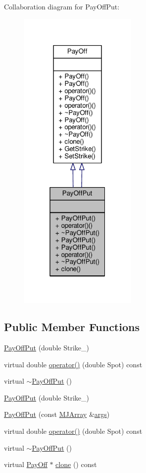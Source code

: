 Collaboration diagram for Pay\+Off\+Put\+:
\nopagebreak
\begin{figure}[H]
\begin{center}
\leavevmode
\includegraphics[width=163pt]{classPayOffPut__coll__graph}
\end{center}
\end{figure}
\subsection*{Public Member Functions}
\begin{DoxyCompactItemize}
\item 
\hyperlink{classPayOffPut_a56cbaf3c01a4bed8a64d71f1a6c0eb1f}{Pay\+Off\+Put} (double Strike\+\_\+)
\item 
virtual double \hyperlink{classPayOffPut_a6dc8b470aaa1544814cfdf6bbed273df}{operator()} (double Spot) const
\item 
virtual \hyperlink{classPayOffPut_abe98c70df681b36063f59671fc2877f6}{$\sim$\+Pay\+Off\+Put} ()
\item 
\hyperlink{classPayOffPut_a56cbaf3c01a4bed8a64d71f1a6c0eb1f}{Pay\+Off\+Put} (double Strike\+\_\+)
\item 
\hyperlink{classPayOffPut_a16c35a5fdd65b105863853a90a58ec7d}{Pay\+Off\+Put} (const \hyperlink{classMJArray}{M\+J\+Array} \&\hyperlink{path__generation_8h_a75c13cde2074f502cc4348c70528572d}{args})
\item 
virtual double \hyperlink{classPayOffPut_a6dc8b470aaa1544814cfdf6bbed273df}{operator()} (double Spot) const
\item 
virtual \hyperlink{classPayOffPut_abe98c70df681b36063f59671fc2877f6}{$\sim$\+Pay\+Off\+Put} ()
\item 
virtual \hyperlink{classPayOff}{Pay\+Off} $\ast$ \hyperlink{classPayOffPut_a95fe4c1716cf0f078967acdb31cf87e4}{clone} () const
\end{DoxyCompactItemize}
